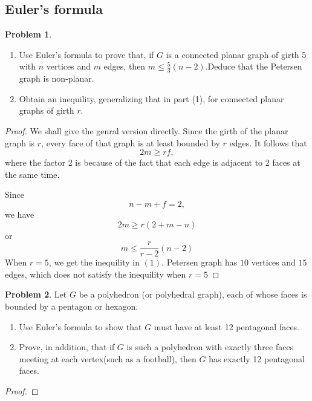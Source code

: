\documentclass[a4paper,11pt]{article}%
\theoremstyle{remark}
\theoremstyle{definition}
\newtheorem{problem}{Problem}[subsection]
\begin{document}
\subsection{Euler's formula}
\begin{problem}
    \begin{enumerate}
        \item Use Euler's formula to prove that, if $G$ is a connected planar graph of girth 5 with $n$ vertices and $m$ edges, then $m\leq \frac{5}{3}(n-2).$Deduce that the Petersen graph is non-planar.
        \item Obtain an inequility, generalizing that in part (1), for connected planar graphs of girth $r$.
    \end{enumerate}
    \begin{proof}
      We shall give the genral version directly.
      Since the girth of the planar graph is $r$, every face of that graph is at least bounded by $r$ edges. It follows that 
      \[2m\geq rf,\]  
      where the factor 2 is because of the fact that each edge is adjacent to 2 faces at the same time.

      Since 
      \[n-m+f=2,\]
      we have 
      \[ 2m\geq r(2+m-n)\]
      or 
      \[ m\leq \frac{r}{r-2}(n-2)\]
      When $r=5$, we get the inequility in $(1)$. Petersen graph has $10$ vertices and $15$ edges, which does not satisfy the inequility when $r=5$ 
    \end{proof}
\end{problem}
\begin{problem}
    Let $G$ be a polyhedron (or polyhedral graph), each of whose faces is bounded by a pentagon or hexagon.
    \begin{enumerate}
        \item Use Euler's formula to show that $G$ must have at least 12 pentagonal faces.
        \item Prove, in addition, that if $G$ is such a polyhedron with exactly three faces meeting at each vertex(such as a football), then $G$ has exactly 12 pentagonal faces.
    \end{enumerate}
    \begin{proof}
    \end{proof}
\end{problem}
\end{document}
